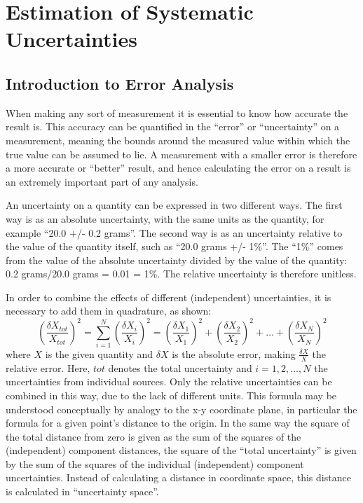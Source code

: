 \section{Estimation of Systematic Uncertainties}
\label{anMeth:Systs}

\subsection{Introduction to Error Analysis}
\label{anMeth:SystsIntro}

When making any sort of measurement it is essential 
to know how accurate the result is.  
This accuracy can be quantified in the 
``error'' or ``uncertainty'' 
on a measurement, 
meaning the bounds around the measured value 
within which the true value can be assumed to lie.  
A measurement with a smaller error is 
therefore a more accurate or ``better'' result, 
and hence calculating the error on a result is 
an extremely important part of 
any analysis.  

An uncertainty on a quantity can be 
expressed in two different ways.  
The first way is as an absolute uncertainty, 
with the same units as the quantity, 
for example ``20.0 +/- 0.2 grams''.  
The second way is as an uncertainty 
relative to the value of the quantity itself, 
such as ``20.0 grams +/- 1\%''.  
The ``1\%'' comes from the value of the absolute 
uncertainty divided by the value of the quantity: 
0.2 grams/20.0 grams = 0.01 = 1\%. 
The relative uncertainty is therefore unitless.  


In order to combine the effects of 
different (independent) uncertainties, 
it is necessary to add them 
in quadrature, as shown:
\[
\left(\frac{\delta X_{tot}}{X_{tot}}\right)^2 
= \sum_{i=1}^{N} \left(\frac{\delta X_i}{X_i}\right)^2 
= \left(\frac{\delta X_1}{X_1}\right)^2 
+ \left(\frac{\delta X_2}{X_2}\right)^2 
+ \ldots
+ \left(\frac{\delta X_N}{X_N}\right)^2 
\]
where 
$X$ is the given quantity and 
$\delta X$ is the absolute error, 
making $\frac{\delta X}{X}$ the relative error.  
Here, $tot$ denotes the total uncertainty 
and $i=1,2,\ldots ,N$ the uncertainties from 
individual sources.  
Only the relative uncertainties 
can be combined in this way, 
due to the lack of different units.  
This formula may be understood 
conceptually by analogy to the 
x-y coordinate plane, in particular 
the formula for a given point's distance 
to the origin.  
In the same way the square of the total distance 
from zero is given as the sum of the squares 
of the (independent) component distances, 
the square of the ``total uncertainty'' 
is given by the sum of the squares of the 
individual (independent) component uncertainties.  
Instead of calculating a distance in %
coordinate space, 
this distance is calculated in 
``uncertainty space''.

